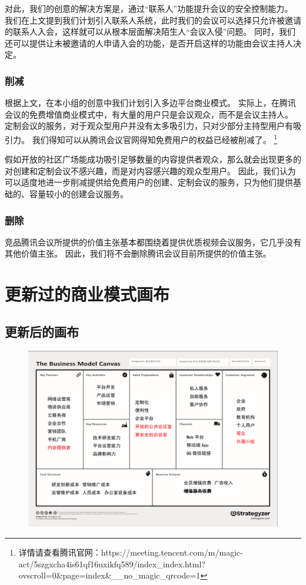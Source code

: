 \documentclass[a4paper,12pt]{article}
\begin{document}
    对此，我们的创意的解决方案是，通过“联系人”功能提升会议的安全控制能力。
    我们在上文提到我们计划引入联系人系统，此时我们的会议可以选择只允许被邀请的联系人入会，这样就可以从根本层面解决陌生人“会议入侵”问题。
    同时，我们还可以提供让未被邀请的人申请入会的功能，是否开启这样的功能由会议主持人决定。


    \subsubsection{削减}
    根据上文，在本小组的创意中我们计划引入多边平台商业模式。
    实际上，在腾讯会议的免费增值商业模式中，有大量的用户只是会议观众，而不是会议主持人。
    定制会议的服务，对于观众型用户并没有太多吸引力，只对少部分主持型用户有吸引力。
    我们得知可以从腾讯会议官网得知免费用户的权益已经被削减了。
    \footnote{详情请查看腾讯官网：https://meeting.tencent.com/m/magic-act/5szgxcha4is61qf16uxikfq589/index\_index.html?ovscroll=0\&page=index\&\_\_no\_magic\_qrcode=1}

    假如开放的社区广场能成功吸引足够数量的内容提供者观众，那么就会出现更多的对创建和定制会议不感兴趣，而是对内容感兴趣的观众型用户。
    因此，我们认为可以适度地进一步削减提供给免费用户的创建、定制会议的服务，只为他们提供基础的、容量较小的创建会议服务。


    \subsubsection{删除}

    竞品腾讯会议所提供的价值主张基本都围绕着提供优质视频会议服务，它几乎没有其他价值主张。
    因此，我们将不会删除腾讯会议目前所提供的价值主张。


    


\section{更新过的商业模式画布}
    \subsection{更新后的画布}
    \clearpage
    \begin{figure}[htbp]
        \centering
        \includegraphics[scale=0.3]{png/更新画布}
        \caption{}
        \label{fig:update}
    \end{figure}
\end{document}
